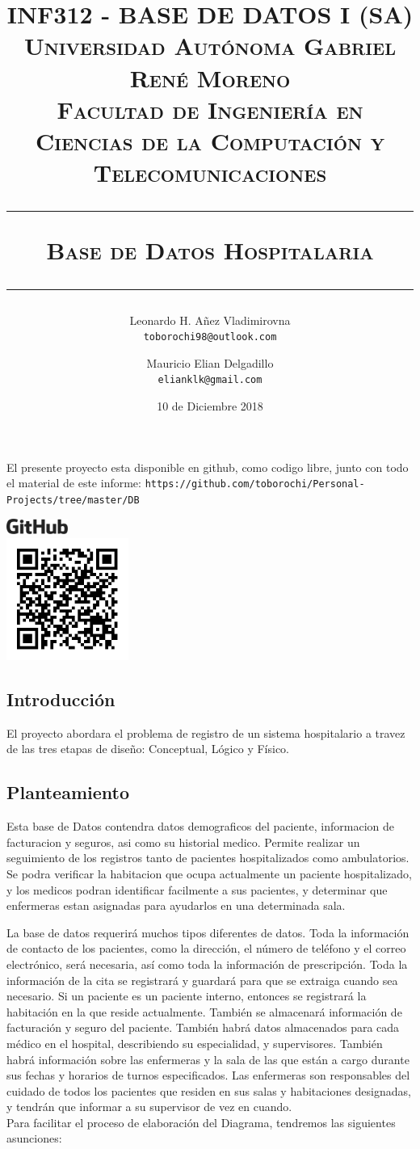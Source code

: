 \documentclass[10pt,letterpaper]{book}
\date{10 de Diciembre 2018}
\author{
Leonardo H. Añez Vladimirovna\\
\texttt{toborochi98@outlook.com}
\and
Mauricio Elian Delgadillo\\
\texttt{elianklk@gmail.com}
}
\title{
{\large \textbf{\textsc{INF312 - BASE DE DATOS I (SA)}}}\\\vspace{0.5cm}
{\large \textsc{Universidad Autónoma Gabriel René Moreno \\ \vspace{0.5cm} Facultad de Ingeniería en Ciencias de la Computación y\\ \vspace{0.4cm} Telecomunicaciones}} \vspace{0.5cm} 
\hrule\vspace{0.5cm}
{\LARGE \textsc{Base de Datos Hospitalaria}}
\vspace{0.5cm}
\hrule
}
\begin{document}
\maketitle
El presente proyecto esta disponible en github, como codigo libre, junto con todo el material de este informe: \texttt{https://github.com/toborochi/Personal-Projects/tree/master/DB}
\vspace{-30cm}
\begin{center}
\includegraphics[width=2cm]{git}\\
\includegraphics[width=4cm]{DB312}
\end{center}
\pagebreak
\subsection*{Introducción}
El proyecto abordara el problema de registro de un sistema hospitalario a travez de las tres etapas de diseño: Conceptual, Lógico y Físico.
\subsection*{Planteamiento}
Esta base de Datos contendra datos demograficos del paciente, informacion de facturacion y seguros, asi como su historial medico. 
Permite realizar un seguimiento de los registros tanto de pacientes hospitalizados como ambulatorios. Se podra verificar la habitacion que ocupa actualmente un paciente hospitalizado, y los medicos podran identificar facilmente a sus pacientes, y determinar que enfermeras estan asignadas para ayudarlos en una determinada sala.

La base de datos requerirá muchos tipos diferentes de datos. Toda la información de contacto de los pacientes, como la dirección, el número de teléfono y el correo electrónico, será necesaria, así como toda la información de prescripción. Toda la información de la cita se registrará y guardará para que se extraiga cuando sea necesario. Si un paciente es un paciente interno, entonces se registrará la habitación en la que reside actualmente. También se almacenará información de facturación y seguro del paciente. También habrá datos almacenados para cada médico en el hospital, describiendo su especialidad, y supervisores. También habrá información sobre las enfermeras y la sala de las que están a cargo durante sus fechas y horarios de turnos especificados. Las enfermeras son responsables del cuidado de todos los pacientes que residen en sus salas y habitaciones designadas, y tendrán que informar a su supervisor de vez en cuando. \\
\linebreak
Para facilitar el proceso de elaboración del Diagrama, tendremos las siguientes asunciones:
\end{document}
